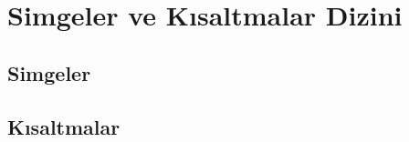 \documentclass[msc]{kou}
\begin{document}
\kapakolustur
\onayolustur

\clearpage
{}

\begingroup
\singlespacing

\etikolustur
\fikriolustur


\onsozolustur

\renewcommand{\listfigurename}{Şekiller Dizini}
\renewcommand{\listtablename}{Tablolar Dizini}
\tableofcontents
\listoffigures
\listoftables

\chapter*{Simgeler ve Kısaltmalar Dizini}
\tocless\section{Simgeler}

\tocless\section{Kısaltmalar}
\addtocounter{section}{1}



\ozetolustur


\createabstract
{}

\endgroup

\clearpage
{}







\begingroup
\singlespacing
\sloppy
\printbibliography[title={Kaynaklar}, notcategory=nobibliography]

\eklerolustur


\begin{refsection}

\end{refsection}


\endgroup
\end{document}
